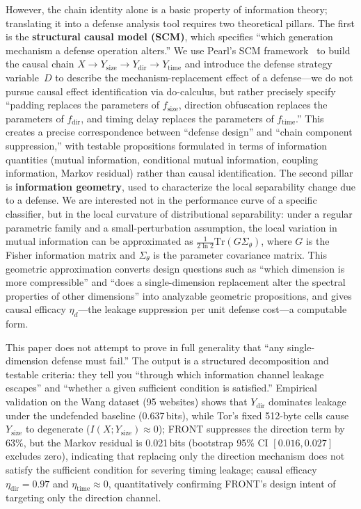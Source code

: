 \documentclass[lettersize,journal]{IEEEtran}
\begin{document}
However, the chain identity alone is a basic property of information
theory; translating it into a defense analysis tool requires two
theoretical pillars.
The first is the \textbf{structural causal model (SCM)}, which specifies
``which generation mechanism a defense operation alters.''
We use Pearl's SCM framework~\cite{pearl2009causality} to build the
causal chain
$X\!\to\!Y_{\mathrm{size}}\!\to\!Y_{\mathrm{dir}}\!\to\!Y_{\mathrm{time}}$
and introduce the defense strategy variable~$D$ to describe the
mechanism-replacement effect of a defense---we do not pursue causal
effect identification via do-calculus, but rather precisely specify
``padding replaces the parameters of $f_{\mathrm{size}}$, direction
obfuscation replaces the parameters of $f_{\mathrm{dir}}$, and timing
delay replaces the parameters of $f_{\mathrm{time}}$.''
This creates a precise correspondence between ``defense design'' and
``chain component suppression,'' with testable propositions formulated in
terms of information quantities (mutual information, conditional mutual
information, coupling information, Markov residual) rather than causal
identification.
The second pillar is \textbf{information geometry}, used to characterize
the local separability change due to a defense.
We are interested not in the performance curve of a specific classifier,
but in the local curvature of distributional separability:
under a regular parametric family and a small-perturbation assumption,
the local variation in mutual information can be approximated as
$\frac{1}{2\ln 2}\mathrm{Tr}(G\Sigma_\theta)$, where $G$ is the Fisher
information matrix and $\Sigma_\theta$ is the parameter covariance matrix.
This geometric approximation converts design questions such as ``which
dimension is more compressible'' and ``does a single-dimension replacement
alter the spectral properties of other dimensions'' into analyzable
geometric propositions, and gives causal efficacy $\eta_d$---the leakage
suppression per unit defense cost---a computable form.

This paper does not attempt to prove in full generality that ``any
single-dimension defense must fail.''
The output is a structured decomposition and testable criteria: they tell
you ``through which information channel leakage escapes'' and ``whether a
given sufficient condition is satisfied.''
Empirical validation on the Wang dataset (95 websites) shows that
$Y_{\mathrm{dir}}$ dominates leakage under the undefended baseline
(0.637\,bits), while Tor's fixed 512-byte cells cause
$Y_{\mathrm{size}}$ to degenerate ($I(X;Y_{\mathrm{size}})\approx 0$);
FRONT suppresses the direction term by 63\%, but the Markov residual is
0.021\,bits (bootstrap 95\% CI $[0.016,0.027]$ excludes zero), indicating
that replacing only the direction mechanism does not satisfy the sufficient
condition for severing timing leakage;
causal efficacy $\eta_{\mathrm{dir}}=0.97$ and
$\eta_{\mathrm{time}}\approx 0$, quantitatively confirming FRONT's design
intent of targeting only the direction channel.
\end{document}
